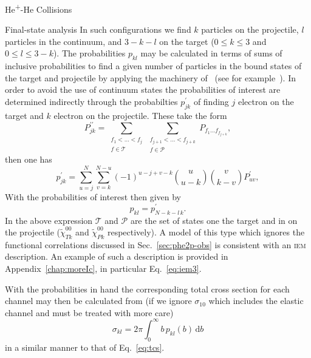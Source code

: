 \documentclass[letterpaper, 11 pt]{report}
\begin{document}
\begin{chapter}{\texorpdfstring{He\textsuperscript{+}}{He+}-He Collisions \label{chap:hephe}}
\begin{section}{Final-state analysis \label{sec:hephe-det}}
      In such configurations we find $k$ particles on the projectile, $l$ particles in the continuum,
      and $3 - k - l$ on the target ($0\leq k \leq 3$ and $0 \leq l \leq 3 - k$). The probabilities
      $p_{kl}$ may be calculated in terms of sums of inclusive probabilities to find a given number of
      particles in the bound states of the target and projectile by applying the machinery
      of~\cite{inc-prob} (see for example~\cite{incEx, mitsuko12, gerald15}). In order to avoid the use
      of continuum states the probabilities of interest are determined indirectly through the
      probabilties $p^\prime_{jk}$ of finding $j$ electron on the target and $k$ electron on the
      projectile. These take the form
      \begin{equation} \label{eq:probGer1}
         P^{\prime\prime}_{jk} = \sum\limits_{\substack{f_1 < \dots < f_j \\ f \in \mathcal{T}}}
                         \sum\limits_{\substack{f_{j+1} < \dots < f_{j+k} \\ f \in \mathcal{P}}}
                         P_{f_1 \dots f_{f_{j+k}}},
      \end{equation}
      then one has
      \begin{equation} \label{eq:probGer2}
         p^\prime_{jk} = \sum\limits_{u = j}^N \sum\limits_{v = k}^{N-u} (-1)^{u - j + v -k}
                   {{u}\choose{u-k}} {{v}\choose{k - v}} P^\prime_{uv},
      \end{equation}
      With the probabilities of interest then given by
      \begin{equation}
         p_{kl} = p^\prime_{N - k - l \, k}.
      \end{equation}
      In the above expression $\mathcal{T}$ and $\mathcal{P}$ are the set of states one the target
      and in on the projectile ($\tilde{\chi}^{00}_{Tk}$ and $\tilde{\chi}^{00}_{Pk}$ respectively). A
      model of this type which ignores the functional correlations discussed in Sec.~\ref{sec:phe2p-obs}
      is consistent with an \textsc{iem} description. An example of such a description is provided in
      Appendix~\ref{chap:moreIc}, in particular Eq.~\eqref{eq:iem3}.

      With the probabilities in hand the corresponding total cross section for each channel may then be
      calculated from (if we ignore $\sigma_{10}$ which includes the elastic channel and must be treated
      with more care)
      \begin{equation} \label{eq:cross}
         \sigma_{kl} = 2 \pi \int_0^\infty b \, p_{kl}(b) \, \mathrm{d}b
      \end{equation}
      in a similar manner to that of Eq.~\eqref{eq:tcs}.


\end{section}
\end{chapter}
\end{document}
